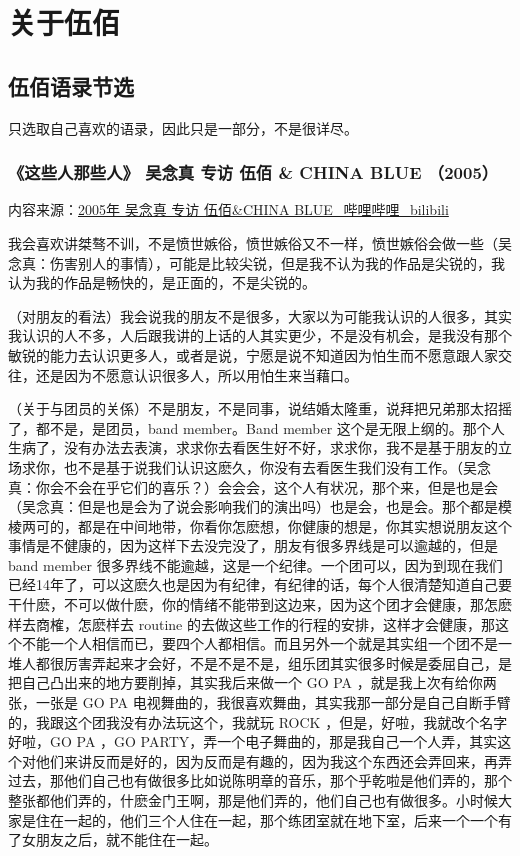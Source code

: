 \documentclass[UTF8,a4paper,oneside,twocolumn,12pt]{ctexbook}
\begin{document}
\onecolumn
\part{关于伍佰}
\chapter{伍佰语录节选}
只选取自己喜欢的语录，因此只是一部分，不是很详尽。

\section{《这些人那些人》 吴念真 专访 伍佰 \& CHINA BLUE （2005）}
内容来源：\href{https://www.bilibili.com/video/BV1Jx411X79n}{2005年 吴念真 专访 伍佰\&CHINA BLUE\_哔哩哔哩\_bilibili}

我会喜欢讲桀骜不训，不是愤世嫉俗，愤世嫉俗又不一样，愤世嫉俗会做一些（吴念真：伤害别人的事情），可能是比较尖锐，但是我不认为我的作品是尖锐的，我认为我的作品是畅快的，是正面的，不是尖锐的。

（对朋友的看法）我会说我的朋友不是很多，大家以为可能我认识的人很多，其实我认识的人不多，人后跟我讲的上话的人其实更少，不是没有机会，是我没有那个敏锐的能力去认识更多人，或者是说，宁愿是说不知道因为怕生而不愿意跟人家交往，还是因为不愿意认识很多人，所以用怕生来当藉口。

（关于与团员的关係）不是朋友，不是同事，说结婚太隆重，说拜把兄弟那太招摇了，都不是，是团员，band member。Band member 这个是无限上纲的。那个人生病了，没有办法去表演，求求你去看医生好不好，求求你，我不是基于朋友的立场求你，也不是基于说我们认识这麽久，你没有去看医生我们没有工作。（吴念真：你会不会在乎它们的喜乐？）会会会，这个人有状况，那个来，但是也是会（吴念真：但是也是会为了说会影响我们的演出吗）也是会，也是会。那个都是模棱两可的，都是在中间地带，你看你怎麽想，你健康的想是，你其实想说朋友这个事情是不健康的，因为这样下去没完没了，朋友有很多界线是可以逾越的，但是 band member 很多界线不能逾越，这是一个纪律。一个团可以，因为到现在我们已经14年了，可以这麽久也是因为有纪律，有纪律的话，每个人很清楚知道自己要干什麽，不可以做什麽，你的情绪不能带到这边来，因为这个团才会健康，那怎麽样去商榷，怎麽样去 routine 的去做这些工作的行程的安排，这样才会健康，那这个不能一个人相信而已，要四个人都相信。而且另外一个就是其实组一个团不是一堆人都很厉害弄起来才会好，不是不是不是，组乐团其实很多时候是委屈自己，是把自己凸出来的地方要削掉，其实我后来做一个 GO PA ，就是我上次有给你两张，一张是 GO PA 电视舞曲的，我很喜欢舞曲，其实我那一部分是自己自断手臂的，我跟这个团我没有办法玩这个，我就玩 ROCK ，但是，好啦，我就改个名字好啦，GO PA ，GO PARTY，弄一个电子舞曲的，那是我自己一个人弄，其实这个对他们来讲反而是好的，因为反而是有趣的，因为我这个东西还会弄回来，再弄过去，那他们自己也有做很多比如说陈明章的音乐，那个乎乾啦是他们弄的，那个整张都他们弄的，什麽金门王啊，那是他们弄的，他们自己也有做很多。小时候大家是住在一起的，他们三个人住在一起，那个练团室就在地下室，后来一个一个有了女朋友之后，就不能住在一起。
\end{document}
